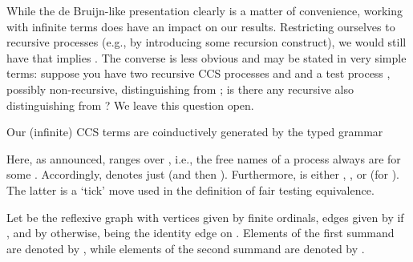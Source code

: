 \documentclass{LMCS}
\theoremstyle{plain}\newtheorem{satz}[thm]{Satz}
\begin{document}
\begin{rem}
  While the de Bruijn-like presentation clearly is a matter of
  convenience, working with infinite terms does have an impact on our
  results.  Restricting ourselves to recursive processes (e.g., by
  introducing some recursion construct), we would still have that
   implies .  The
  converse is less obvious and may be stated in very simple terms:
  suppose you have two recursive CCS processes  and  and a test
  process , possibly non-recursive, distinguishing  from ; is
  there any recursive  also distinguishing  from ?  We leave
  this question open.
\end{rem}



Our (infinite) CCS terms are coinductively generated by the typed grammar
Here, as announced,  ranges over , i.e., the free names of
a process always are  for some . Accordingly, 
denotes just  (and then ).  Furthermore,  is
either , , or  (for ).  The latter is a
`tick' move used in the definition of fair testing equivalence.

\begin{defi}\label{def:A}
  Let  be the reflexive graph with vertices given by finite
  ordinals, edges  given by  if , and by  otherwise,   being the identity edge on .
  Elements of the first summand are denoted by , while elements of the second summand are denoted by
  .
\end{defi}
\end{document}
